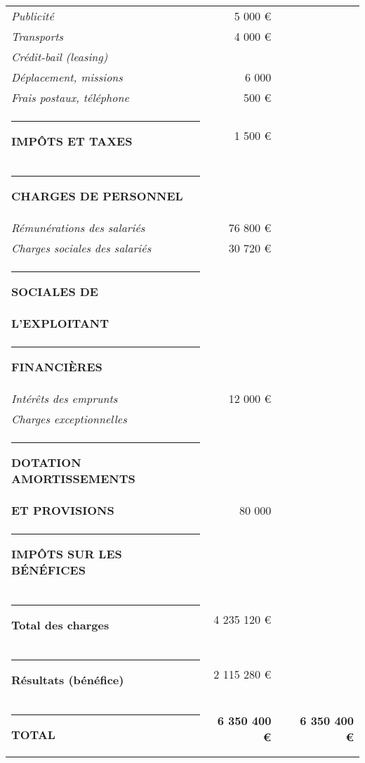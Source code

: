 \documentclass[12pt,a4paper]{report}
\begin{document}
\begin{table}[h]
\begin{tabular}{l|r|l|r}
				\textit{Publicité} & 5 000 € & & \\	
				\textit{Transports} &	4 000 €  & & \\		
				\textit{Crédit-bail (leasing)} & & & \\			
				\textit{Déplacement, missions} &	6 000	&  & \\	
				\textit{Frais postaux, téléphone} &	500	€ & &  \\	
				\rule[0.5cm]{-0.1cm}{0cm}
				\textbf{\small \color{green}IMPÔTS ET TAXES} &	1 500 € & & \\
				\rule[0.5cm]{-0.1cm}{0cm}	
				\textbf{\small\color{green} CHARGES DE PERSONNEL}	& & & \\		
				\textit{Rémunérations des salariés} &	76 800 € &  & \\		
				\textit{Charges sociales des salariés} &	30 720 € & &  \\		
				\rule[0.5cm]{-0.1cm}{0cm}	
				\textbf{\small \color{green} SOCIALES DE } & & & \\		
				\textbf{\small \color{green}L'EXPLOITANT} &&&\\
				\rule[0.5cm]{-0.1cm}{0cm}
				\textbf{\small \color{green} FINANCIÈRES}		& & & \\	
				\textit{Intérêts des emprunts} &	12 000 €	& &  \\	
				\textit{Charges exceptionnelles} & & & \\	
				\rule[0.5cm]{-0.1cm}{0cm}		
				\textbf{\small \color{green}DOTATION AMORTISSEMENTS}	& & & \\	
				\textbf{\small\color{green} ET PROVISIONS} &	80 000	 & & \\	
				\rule[0.5cm]{-0.1cm}{0cm}
				\textbf{\small\color{green} IMPÔTS SUR LES BÉNÉFICES }	& & & \\
				\rule[0.5cm]{-0.1cm}{0cm}
				\textbf{Total des charges} &	4 235 120 €  & & \\	
				\rule[0.5cm]{-0.1cm}{0cm}
				\textbf{Résultats (bénéfice)} &	2 115 280 € & &  \\	
				\rule[0.5cm]{-0.1cm}{0cm}	
				\textbf{\color{green}TOTAL} &	\textbf{\color{green}6 350 400 €} &	\textbf{\color{green}} &	\textbf{\color{green}6 350 400 €} \\
				
			\end{tabular}%
			\label{tab:addlabel}%
		\end{table}%
		
\end{document}
